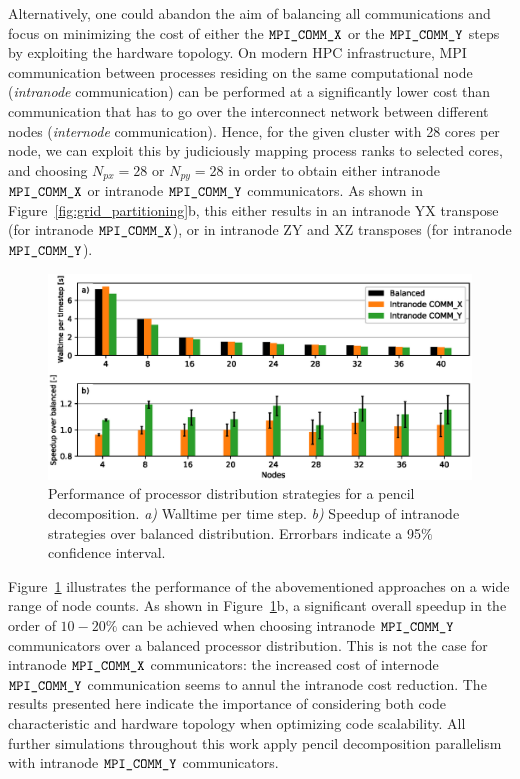 Alternatively, one could abandon the aim of balancing all communications and focus on minimizing the cost of either the $\verb|MPI_COMM_X|$ or the $\verb|MPI_COMM_Y|$ steps by exploiting the hardware topology. On modern HPC infrastructure, MPI communication between processes residing on the same computational node (\emph{intranode} communication) can be performed at a significantly lower cost than communication that has to go over the interconnect network between different nodes (\emph{internode} communication). Hence, for the given cluster with 28 cores per node, we can exploit this by judiciously mapping process ranks to selected cores, and choosing $N_{px} = 28$ or $N_{py} = 28$ in order to obtain either intranode $\verb|MPI_COMM_X|$ or intranode $\verb|MPI_COMM_Y|$ communicators. As shown in Figure~\ref{fig:grid_partitioning}b, this either results in an intranode YX transpose (for intranode $\verb|MPI_COMM_X|$), or in intranode ZY and XZ transposes (for intranode $\verb|MPI_COMM_Y|$). 

\begin{figure}
	\includegraphics[width=\textwidth]{figures/meth_balanced_intranode_bw.eps}
	\caption[Performance of processor distribution strategies for a pencil decomposition.]{Performance of processor distribution strategies for a pencil decomposition. \emph{a)} Walltime per time step. \emph{b)} Speedup of intranode strategies over  balanced distribution. Errorbars indicate a 95$\%$ confidence interval. \label{fig:balanced_intranode}}
\end{figure}

Figure~\ref{fig:balanced_intranode} illustrates the performance of the abovementioned approaches on a wide range of node counts. As shown in Figure~\ref{fig:balanced_intranode}b, a significant overall speedup in the order of $10 - 20\%$ can be achieved when choosing intranode $\verb|MPI_COMM_Y|$ communicators over a balanced processor distribution. This is not the case for intranode $\verb|MPI_COMM_X|$ communicators: the increased cost of internode $\verb|MPI_COMM_Y|$ communication seems to annul the intranode cost reduction. The results presented here indicate the importance of considering both code characteristic and hardware topology when optimizing code scalability. All further simulations throughout this work apply pencil decomposition parallelism with intranode $\verb|MPI_COMM_Y|$ communicators.

